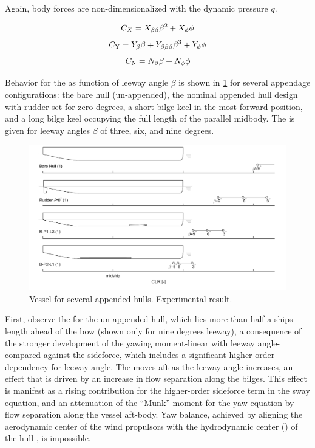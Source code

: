 \documentclass[twoside,twocolumn]{article}
\begin{document}
	\noindent
	Again, body forces are non-dimensionalized with the dynamic pressure $q$.
	
	
	\begin{equation}
	C_{X}=X_{\beta \beta}\beta^{2}+X_{\phi}\phi
	\end{equation}
	\begin{equation}
	C_\mathrm{Y}=Y_{\beta}\beta+Y_{\beta \beta \beta}\beta^{3}+Y_{\phi}\phi
	\end{equation}
	\begin{equation}
	C_\mathrm{N}=N_{\beta}\beta+N_{\phi}\phi
	\end{equation}
	
	Behavior for the \CLR as function of leeway angle $\beta$ is shown in \cref{fig:CLRdemo} for several appendage configurations: the bare hull (un-appended), the nominal appended hull design with rudder set for zero degrees, a short bilge keel in the most forward position, and a long bilge keel occupying the full length of the parallel midbody. The \CLR is given for leeway angles $\beta$ of three, six, and nine degrees. 
	
	\begin{figure}[!th]
		\centering
		\includegraphics[width=\textwidth]{images/1_CLR_demo}
		\caption{Vessel \CLR for several appended hulls. Experimental result.}
		\label{fig:CLRdemo}
	\end{figure}
	\noindent
	First, observe the \CLR for the un-appended hull, which lies more than half a ships-length ahead of the bow (shown only for nine degrees leeway), a consequence of the stronger development of the yawing moment-linear with leeway angle-compared against the sideforce, which includes a significant higher-order dependency for leeway angle. The \CLR moves aft as the leeway angle increases, an effect that is driven by an increase in flow separation along the bilges. This effect is manifest as a rising contribution for the higher-order sideforce term in the sway equation, and an attenuation of the “Munk” moment for the yaw equation by flow separation along the vessel aft-body. Yaw balance, achieved by aligning the aerodynamic center of the wind propulsors with the hydrodynamic center (\CLR) of the hull \cite{Claughton03}, is impossible.
	
\end{document}
